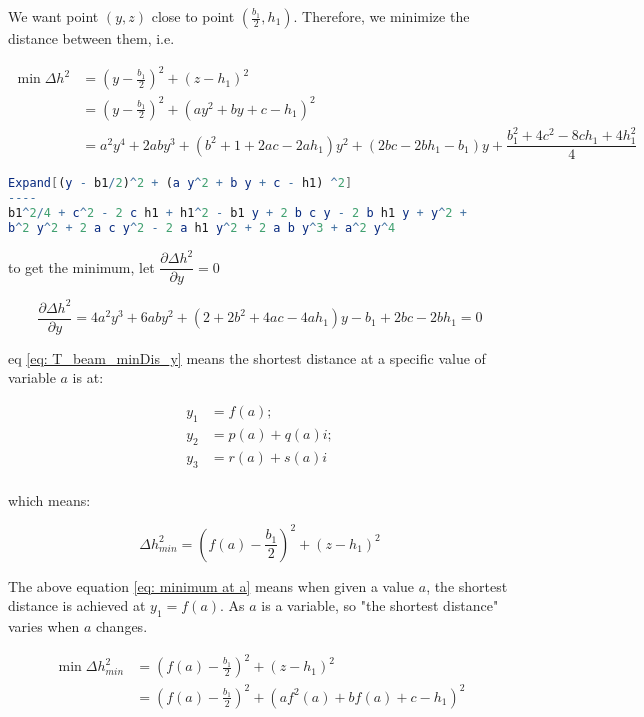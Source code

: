 We want point $ \left( y, z\right) $ close to point $ \left( \frac{b_1}{2}, h_1 \right) $. Therefore, we minimize the distance between them, i.e.

\begin{align*}
\min \Delta h^2 &= \left( y-\frac{b_1}{2} \right)^2 + \left( z - h_1 \right)^2 \\
&= \left( y-\frac{b_1}{2} \right)^2 + \left( a y^2 + b y + c - h_1 \right)^2 \\
&= a^2 y^4 + 2 a b y^3 + \left(b^2+1+2 a c -2 a h_1\right) y^2 + \left( 2 b c- 2 b h_1 - b_1\right) y +\dfrac{b_1^2 + 4 c^2- 8 c h_1 + 4 h_1^2}{4}
\end{align*}

\begin{lstlisting}[language=mathematica]
Expand[(y - b1/2)^2 + (a y^2 + b y + c - h1) ^2]
----
b1^2/4 + c^2 - 2 c h1 + h1^2 - b1 y + 2 b c y - 2 b h1 y + y^2 + 
b^2 y^2 + 2 a c y^2 - 2 a h1 y^2 + 2 a b y^3 + a^2 y^4
\end{lstlisting}

to get the minimum, let $ \dfrac{\partial \Delta h^2}{ \partial y} = 0 $

\begin{equation} \label{eq: T_beam_minDis_y}
\dfrac{\partial \Delta h^2}{ \partial y} = 4 a^2 y^3 + 6 a b y^2 + (2 + 2 b^2 + 4 a c - 4 a h_1) y - b_1 +2 b c - 2 b h_1= 0
\end{equation}

eq \ref{eq: T_beam_minDis_y} means the shortest distance at a specific value of variable $ a $ is at:

\begin{align*}
y_1 &= f(a); \\
y_2 &= p(a) + q(a) i; \\
y_3 &= r(a) + s(a) i \\
\end{align*}

which means:

\begin{equation} \label{eq: minimum at a}
\Delta h_{min}^2 = \left( f(a)-\frac{b_1}{2} \right)^2 + \left( z - h_1 \right)^2
\end{equation}

The above equation \ref{eq: minimum at a} means when given a value $ a $, the shortest distance is achieved at $ y_1 = f(a) $. As $ a $ is a variable, so "the shortest distance" varies when $ a $ changes. 

\begin{align*}
\min \Delta h_{min}^2 &= \left( f(a)-\frac{b_1}{2} \right)^2 + \left( z - h_1 \right)^2 \\
&= \left( f(a)-\frac{b_1}{2} \right)^2 + \left( a f^2(a) + b f(a) + c - h_1 \right)^2
\end{align*}

